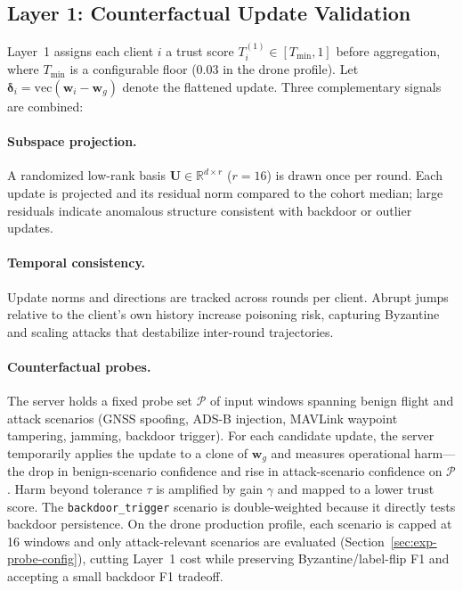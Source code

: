 \subsection{Layer 1: Counterfactual Update Validation}
\label{sec:method-l1}

Layer~1 assigns each client $i$ a trust score $T_i^{(1)} \in [T_{\min}, 1]$ before aggregation, where $T_{\min}$ is a configurable floor (0.03 in the drone profile).
Let $\boldsymbol{\delta}_i = \mathrm{vec}(\mathbf{w}_i - \mathbf{w}_g)$ denote the flattened update.
Three complementary signals are combined:

\paragraph{Subspace projection.}
A randomized low-rank basis $\mathbf{U} \in \mathbb{R}^{d \times r}$ ($r{=}16$) is drawn once per round.
Each update is projected and its residual norm compared to the cohort median; large residuals indicate anomalous structure consistent with backdoor or outlier updates.

\paragraph{Temporal consistency.}
Update norms and directions are tracked across rounds per client.
Abrupt jumps relative to the client's own history increase poisoning risk, capturing Byzantine and scaling attacks that destabilize inter-round trajectories.

\paragraph{Counterfactual probes.}
The server holds a fixed probe set $\mathcal{P}$ of input windows spanning benign flight and attack scenarios (GNSS spoofing, ADS-B injection, MAVLink waypoint tampering, jamming, backdoor trigger).
For each candidate update, the server temporarily applies the update to a clone of $\mathbf{w}_g$ and measures operational harm---the drop in benign-scenario confidence and rise in attack-scenario confidence on $\mathcal{P}$.
Harm beyond tolerance $\tau$ is amplified by gain $\gamma$ and mapped to a lower trust score.
The \texttt{backdoor\_trigger} scenario is double-weighted because it directly tests backdoor persistence.
On the drone production profile, each scenario is capped at 16 windows and only attack-relevant scenarios are evaluated (Section~\ref{sec:exp-probe-config}), cutting Layer~1 cost while preserving Byzantine/label-flip F1 and accepting a small backdoor F1 tradeoff.

